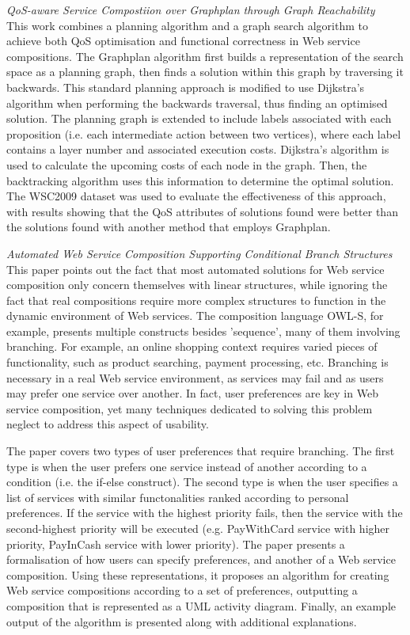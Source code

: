 \textit{QoS-aware Service Compostiion over Graphplan through Graph Reachability \cite{chen2014qos}}\\
This work combines a planning algorithm and a graph search algorithm to achieve both QoS optimisation and functional correctness in Web service compositions. The
Graphplan algorithm first builds a representation of the search space as a planning graph, then finds a solution within this graph by traversing it backwards. This
standard planning approach is modified to use Dijkstra's algorithm when performing the backwards traversal, thus finding an optimised solution. The planning graph
is extended to include labels associated with each proposition (i.e. each intermediate action between two vertices), where each label contains a layer number and
associated execution costs. Dijkstra's algorithm is used to calculate the upcoming costs of each node in the graph. Then, the backtracking algorithm uses this
information to determine the optimal solution. The WSC2009 dataset was used to evaluate the effectiveness of this approach, with results showing that the QoS
attributes of solutions found were better than the solutions found with another method that employs Graphplan.

\textit{Automated Web Service Composition Supporting Conditional Branch Structures \cite{wang2014automated}}\\
This paper points out the fact that most automated solutions for Web service composition only concern themselves
with linear structures, while ignoring the fact that real compositions require more complex structures to
function in the dynamic environment of Web services. The composition language OWL-S, for example,
presents multiple constructs besides 'sequence', many of them involving branching. For example, an online
shopping context requires varied pieces of functionality, such as product searching, payment processing, etc.
Branching is necessary in a real Web service environment, as services may fail and as users may prefer one service
over another. In fact, user preferences are key in Web service composition, yet many techniques dedicated to
solving this problem neglect to address this aspect of usability.

The paper covers two types of user preferences that require branching. The first type is when the user prefers
one service instead of another according to a condition (i.e. the if-else construct). The second type is when the
user specifies a list of services with similar functonalities ranked according to personal preferences. If the
service with the highest priority fails, then the service with the second-highest priority will be executed (e.g.
PayWithCard service with higher priority, PayInCash service with lower priority). The paper presents a
formalisation of how users can specify preferences, and another of a Web service composition. Using these
representations, it proposes an algorithm for creating Web service compositions according to a set of preferences,
outputting a composition that is represented as a UML activity diagram. Finally, an example output of the algorithm
is presented along with additional explanations.

